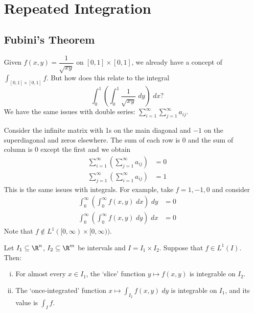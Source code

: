 \newpage
\section{Repeated Integration}
\subsection{Fubini's Theorem}


Given $f(x,y)= \dfrac{1}{\sqrt{xy}}$ on $[0,1] \times [0,1]$, we already have a concept of $\int_{[0,1] \times [0,1]} f$. But how does this relate to the integral
	\[
	\int_0^1 \left( \int_0^1 \dfrac{1}{\sqrt{xy}} \; dy \right) \; dx?
	\]
We have the same issues with double series: $\sum_{i=1}^\infty \sum_{j=1}^\infty a_{ij}$.


\begin{ex}
Consider the infinite matrix with 1s on the main diagonal and $-1$ on the superdiagonal and zeros elsewhere. The sum of each row is 0 and the sum of column is 0 except the first and we obtain
	\[
	\begin{split}
	\sum_{i=1}^\infty \left( \sum_{j=1}^\infty a_{ij} \right)&= 0 \\
	\sum_{j=1}^\infty \left( \sum_{i=1}^\infty a_{ij} \right)&= 1
	\end{split}
	\]
This is the same issues with integrals. For example, take $f=1,-1,0$ and consider
	\[
	\begin{split}
	\int_0^\infty \left( \int_0^\infty f(x,y) \; dx \right) \; dy&= 0 \\
	\int_0^\infty \left( \int_0^\infty f(x,y) \; dy \right) \; dx&= 0
	\end{split}
	\]
Note that $f \notin L^1([0,\infty) \times[0,\infty))$. 
\end{ex}




\begin{thm}
Let $I_1 \subseteq \R^n$, $I_2 \subseteq \R^m$ be intervals and $I= I_1 \times I_2$. Suppose that $f \in L^1(I)$. Then:
	\begin{enumerate}[(i)]
	\item For almost every $x \in I_1$, the `slice' function $y \mapsto f(x,y)$ is integrable on $I_2$.
	\item The `once-integrated' function $x \mapsto \int_{I_2} f(x,y) \; dy$ is integrable on $I_1$, and its value is $\int_I f$. 
	\end{enumerate}
\end{thm}






